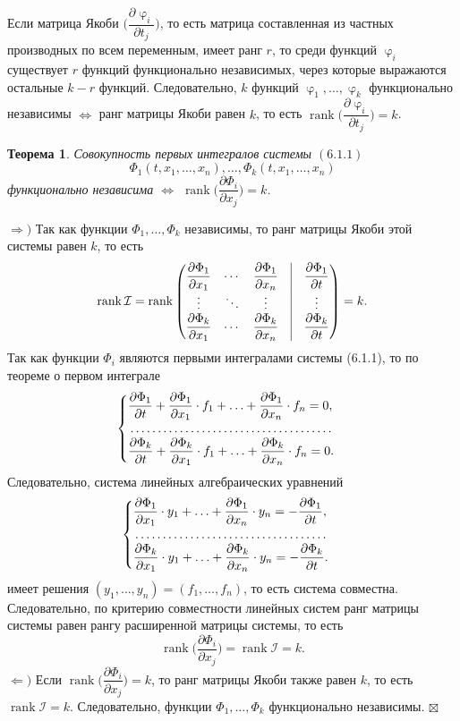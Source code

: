 \documentclass[a4paper, 12pt]{report}
\newenvironment{Proof} %
{\par\noindent{$\blacklozenge$}} %
{\hfill$\scriptstyle\boxtimes$}
\newcommand{\rank}{\operatorname{rank}}
\newcommand{\FI}{\Phi}
\renewcommand{\varphi}{\upvarphi}
\renewcommand{\d}{\partial}
\newtheorem*{theorem}{Теорема}
\begin{document}
Если матрица Якоби $\Big(\dfrac{\d \varphi_i}{\d t_j}\Big)$, то есть матрица составленная из частных производных по всем переменным, имеет ранг $r$, то среди функций $\varphi_i$ существует $r$ функций функционально независимых, через которые выражаются остальные $k-r$ функций. Следовательно, $k$ функций $\varphi_1,\ldots,\varphi_k$ функционально независимы $\Longleftrightarrow$ ранг матрицы Якоби равен $k$, то есть $\rank\Big(\dfrac{\d \varphi_i}{\d t_j}\Big) =k$.
\begin{theorem}
	Совокупность первых интегралов системы $(6.1.1)$ $$\FI_1(t,x_1,\ldots,x_n),\ldots, \FI_k(t,x_1,\ldots,x_n)$$
	функционально независима $\Longleftrightarrow$ $\rank\Big(\dfrac{\d \FI_i}{\d x_j}\Big) = k$.
\end{theorem}\begin{Proof}
$\Rightarrow)$ Так как функции $\FI_1,\ldots, \FI_k$ независимы, то ранг матрицы Якоби этой системы равен $k$, то есть $$\rank \mathcal{I} = \rank \begin{pmatrix}
	\dfrac{\d \FI_1}{\d x_1} & \cdots & \dfrac{\d \FI_1}{\d x_n} & \vline & \dfrac{\d \FI_1}{\d t}\\
	\vdots & \ddots & \vdots & \vline & \vdots\\
	\dfrac{\d \FI_k}{\d x_1} & \cdots & \dfrac{\d \FI_k}{\d x_n} & \vline & \dfrac{\d \FI_k}{\d t}
\end{pmatrix} = k.$$
Так как функции $\FI_i$ являются первыми интегралами системы (6.1.1), то по теореме о первом интеграле $$\begin{cases}
	\dfrac{\d \FI_1}{\d t} + \dfrac{\d \FI_1}{\d x_1}\cdot f_1 + \ldots + \dfrac{\d \FI_1}{\d x_n} \cdot f_n = 0,\\
	\dotfill\\
	\dfrac{\d \FI_k}{\d t} + \dfrac{\d \FI_k}{\d x_1}\cdot f_1 + \ldots + \dfrac{\d \FI_k}{\d x_n} \cdot f_n = 0.
\end{cases}$$
Следовательно, система линейных алгебраических уравнений
$$\begin{cases}
	\dfrac{\d \FI_1}{\d x_1}\cdot y_1 + \ldots + \dfrac{\d \FI_1}{\d x_n} \cdot y_n = -\dfrac{\d \FI_1}{\d t},\\
	\dotfill\\
	 \dfrac{\d \FI_k}{\d x_1}\cdot y_1 + \ldots + \dfrac{\d \FI_k}{\d x_n} \cdot y_n = -\dfrac{\d \FI_k}{\d t}.
\end{cases}$$
имеет решения $(y_1,\ldots, y_n) = (f_1,\ldots, f_n)$, то есть система совместна. Следовательно, по критерию совместности линейных систем ранг матрицы системы равен рангу расширенной матрицы системы, то есть $$\rank \Big(\dfrac{\d \FI_i}{\d x_j}\Big) = \rank \mathcal{I} = k.$$
$\Leftarrow)$ Если $\rank\Big(\dfrac{\d \FI_i}{\d x_j}\Big) = k$, то ранг матрицы Якоби также равен $k$, то есть $\rank\mathcal{I} = k$. Следовательно, функции $\FI_1, \ldots, \FI_k$ функционально независимы.
\end{Proof}
\end{document}
